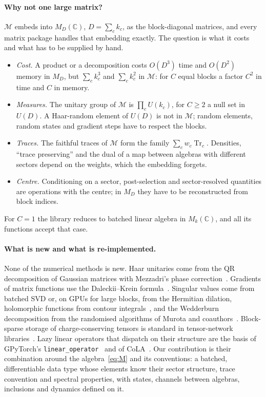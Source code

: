 \documentclass[11pt]{article}
\DeclareMathOperator{\Tr}{Tr}
\newcommand{\C}{\mathbb{C}}
\newcommand{\M}{\mathcal{M}}
\begin{document}
\paragraph{Why not one large matrix?} $\M$ embeds into $M_D(\C)$, $D=\sum_ck_c$, as the block-diagonal matrices, and
every matrix package handles that embedding exactly. The question is what it costs and what has to be supplied by hand.
\begin{itemize}\itemsep0pt
\item \emph{Cost.} A product or a decomposition costs $O(D^3)$ time and $O(D^2)$ memory in $M_D$, but
$\sum_ck_c^3$ and $\sum_ck_c^2$ in $\M$: for $C$ equal blocks a factor $C^2$ in time and $C$ in memory.
\item \emph{Measures.} The unitary group of $\M$ is $\prod_cU(k_c)$, for $C\ge2$ a null set in $U(D)$. A Haar-random
element of $U(D)$ is not in $\M$; random elements, random states and gradient steps have to respect the blocks.
\item \emph{Traces.} The faithful traces of $\M$ form the family $\sum_cw_c\Tr_c$. Densities, ``trace preserving''
and the dual of a map between algebras with different sectors depend on the weights, which the embedding forgets.
\item \emph{Centre.} Conditioning on a sector, post-selection and sector-resolved quantities are operations with the
centre; in $M_D$ they have to be reconstructed from block indices.
\end{itemize}
For $C=1$ the library reduces to batched linear algebra in $M_k(\C)$, and all its functions accept that case.

\paragraph{What is new and what is re-implemented.} None of the numerical methods is new. Haar unitaries come from the
QR decomposition of Gaussian matrices with Mezzadri's phase correction~\cite{mezzadri2007}. Gradients of matrix
functions use the Daleckii--Krein formula~\cite{daleckii1965,bhatia1997}. Singular values come from batched SVD or,
on GPUs for large blocks, from the Hermitian dilation, holomorphic functions from contour integrals~\cite{trefethen2014}, and the Wedderburn decomposition from
the randomised algorithms of Murota and coauthors~\cite{murota2010,maehara2011}. Block-sparse storage of
charge-conserving tensors is standard in tensor-network libraries~\cite{fishman2022,hauschild2018,rams2025}. Lazy
linear operators that dispatch on their structure are the basis of GPyTorch's \texttt{linear\_operator}~\cite{gardner2018,linearoperator}
and of CoLA~\cite{potapczynski2023}. Our contribution is their combination around the algebra~\eqref{eq:M} and its
conventions: a batched, differentiable data type whose elements know their sector structure, trace convention and
spectral properties, with states, channels between algebras, inclusions and dynamics defined on it.
\end{document}
